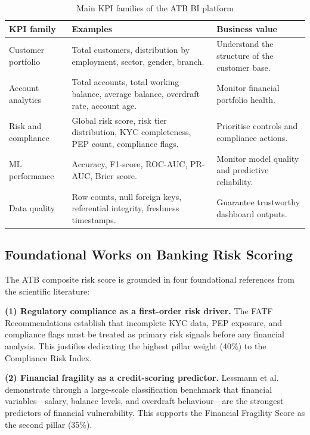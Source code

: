 \begin{table}[H]
\centering
\small
\caption{Main KPI families of the ATB BI platform}
\label{tab:atb_kpis}
\begin{tabular}{|p{4cm}|p{5cm}|p{4.2cm}|}
\hline
\rowcolor{blue!15}
\textbf{KPI family} & \textbf{Examples} & \textbf{Business value} \\
\hline
Customer portfolio & Total customers, distribution by employment, sector, gender, branch. &
Understand the structure of the customer base. \\
\hline
Account analytics & Total accounts, total working balance, average balance, overdraft rate,
account age. & Monitor financial portfolio health. \\
\hline
Risk and compliance & Global risk score, risk tier distribution, KYC completeness, PEP count,
compliance flags. & Prioritise controls and compliance actions. \\
\hline
ML performance & Accuracy, F1-score, ROC-AUC, PR-AUC, Brier score. &
Monitor model quality and predictive reliability. \\
\hline
Data quality & Row counts, null foreign keys, referential integrity, freshness timestamps. &
Guarantee trustworthy dashboard outputs. \\
\hline
\end{tabular}
\end{table}

\subsection{Foundational Works on Banking Risk Scoring}

The ATB composite risk score is grounded in four foundational references from the
scientific literature:

\textbf{(1) Regulatory compliance as a first-order risk driver.}
The FATF Recommendations \cite{fatf2012} establish that incomplete KYC data, PEP exposure,
and compliance flags must be treated as primary risk signals before any financial analysis.
This justifies dedicating the highest pillar weight (40\%) to the Compliance Risk Index.

\textbf{(2) Financial fragility as a credit-scoring predictor.}
Lessmann et al.\ \cite{lessmann2015} demonstrate through a large-scale classification
benchmark that financial variables---salary, balance levels, and overdraft behaviour---are
the strongest predictors of financial vulnerability. This supports the Financial Fragility
Score as the second pillar (35\%).

